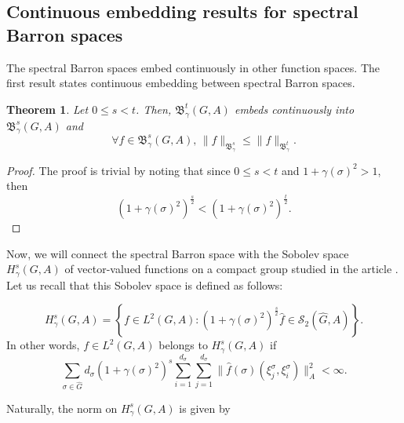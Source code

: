 \documentclass[12pt]{amsart}%
\newtheorem{theorem}{Theorem}[section]
\begin{document}
\subsection{Continuous embedding results for spectral Barron spaces}
The spectral Barron spaces  embed continuously in other function spaces. 
The first result states continuous embedding between spectral Barron spaces. 
\begin{theorem}
Let $0\leq s<t$. Then, $\mathfrak{B}^{t}_\gamma (G,A)$ embeds continuously into  $\mathfrak{B}^{s}_\gamma (G,A)$ and $$\forall f\in \mathfrak{B}^{s}_\gamma (G,A),\, 
\|f\|_{\mathfrak{B}^{s}_\gamma} \leq \|f\|_{\mathfrak{B}^{t}_\gamma}.$$ 
\end{theorem}
\begin{proof}
The proof is trivial by noting that since  $0\leq s<t$ and $1+\gamma (\sigma)^2>1$, then 
$$(1+\gamma (\sigma)^2)^{\frac{s}{2}}< (1+\gamma (\sigma)^2)^{\frac{t}{2}}.$$

\end{proof}






 Now, we will connect the spectral Barron space with the Sobolev space  $H^s_\gamma (G,A)$ of vector-valued functions on  a compact group  studied in the article \cite{Mensah2}. Let us recall that this Sobolev space is defined as follows:

\begin{equation}
H^s_\gamma (G,A)=\left\{f\in L^2(G,A) : (1+\gamma (\sigma)^2)^{\frac{s}{2}}\widehat{f}\in \mathscr{S}_2(\widehat{G}, A)\right\}.
\end{equation}
In other words,  $f\in  L^2(G,A)$ belongs to  $H^s_\gamma (G,A)$ if $$\sum_{\sigma\in \widehat{G}}d_\sigma  (1+\gamma (\sigma)^2)^s\sum_{i=1}^{d_\sigma}\sum_{j=1}^{d_\sigma}\|\widehat{f}(\sigma)(\xi_j^\sigma, \xi_i^\sigma)\|_A^2<\infty.$$

Naturally, the norm on $H^s_\gamma (G,A)$ is given by
\end{document}
